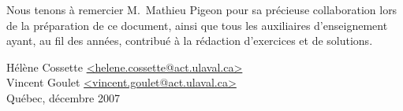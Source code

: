 Nous tenons à remercier M.~Mathieu Pigeon pour sa précieuse
collaboration lors de la préparation de ce document, ainsi que tous
les auxiliaires d'enseignement ayant, au fil des années, contribué à
la rédaction d'exercices et de solutions.

\begin{flushright}
  Hélène Cossette \url{<helene.cossette@act.ulaval.ca>} \\
  Vincent Goulet \url{<vincent.goulet@act.ulaval.ca>} \\
  Québec, décembre 2007
\end{flushright}

